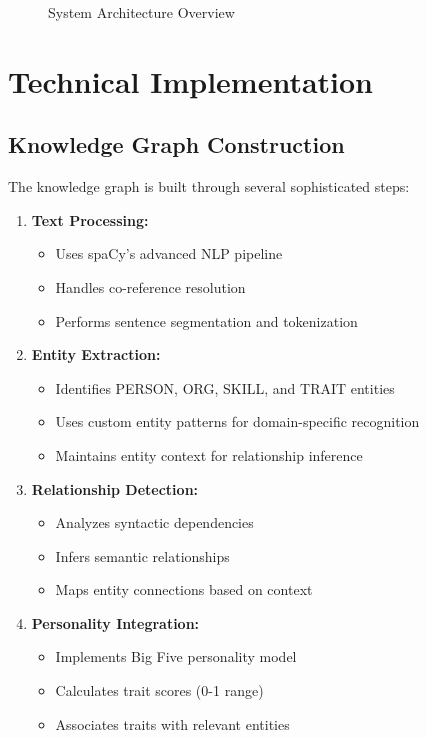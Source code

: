 \documentclass[11pt]{article}
\begin{document}
\begin{figure}[H]
    \centering
    
    \caption{System Architecture Overview}
    \label{fig:architecture}
\end{figure}

\section{Technical Implementation}

\subsection{Knowledge Graph Construction}
The knowledge graph is built through several sophisticated steps:

\begin{enumerate}[label=\textbf{\arabic*.}, itemsep=0.5em]
    \item \textbf{Text Processing:}
    \begin{itemize}
        \item Uses spaCy's advanced NLP pipeline
        \item Handles co-reference resolution
        \item Performs sentence segmentation and tokenization
    \end{itemize}
    
    \item \textbf{Entity Extraction:}
    \begin{itemize}
        \item Identifies PERSON, ORG, SKILL, and TRAIT entities
        \item Uses custom entity patterns for domain-specific recognition
        \item Maintains entity context for relationship inference
    \end{itemize}
    
    \item \textbf{Relationship Detection:}
    \begin{itemize}
        \item Analyzes syntactic dependencies
        \item Infers semantic relationships
        \item Maps entity connections based on context
    \end{itemize}
    
    \item \textbf{Personality Integration:}
    \begin{itemize}
        \item Implements Big Five personality model
        \item Calculates trait scores (0-1 range)
        \item Associates traits with relevant entities
    \end{itemize}
\end{enumerate}
\end{document}
